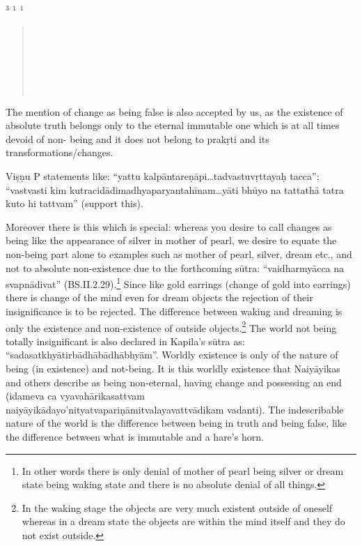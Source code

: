  $^{3}$  $^{1}$ $^{1}$
\begin{verse}
\\
\\
\\
\\
\\
\end{verse}

The mention of change as being false is also accepted by us, as the existence of absolute truth belongs only to the eternal immutable one which is at all times devoid of non- being and it does not belong to prakṛti and its transformations/changes.

Viṣṇu P statements like: “yattu kalpāntareṇāpi…tadvastuvṛttayaḥ tacca”; “vastvasti kim kutracidādimadhyaparyantahīnam…yāti bhūyo na tattathā tatra kuto hi tattvam” (support this).

Moreover there is this which is special: whereas you desire to call changes as being like the appearance of silver in mother of pearl, we desire to equate the non-being part alone to examples such as mother of pearl, silver, dream etc., and not to absolute non-existence due to the forthcoming sūtra: “vaidharmyācca na svapnādivat” (BS.II.2.29).\footnote{In other words there is only denial of mother of pearl being silver or dream state being waking state and there is no absolute denial of all things.} Since like gold earrings (change of gold into earrings) there is change of the mind even for dream objects the rejection of their insignificance is to be rejected. The difference between waking and dreaming is only the existence and non-existence of outside objects.\footnote{In the waking stage the objects are very much existent outside of oneself whereas in a dream state the objects are within the mind itself and they do not exist outside.} The world not being totally insignificant is also declared in Kapila’s sūtra as: “sadasatkhyātirbādhābādhābhyām”.     Worldly existence is only of the nature of being (in existence) and not-being. It is this worldly existence that Naiyāyikas and others describe as being non-eternal, having change and possessing an end (idameva ca vyavahārikasattvam naiyāyikādayo’nityatvapariṇāmitvalayavattvādikam vadanti). The indescribable nature of the world is the difference between being in truth and being false, like the difference between what is immutable and a hare’s horn.

